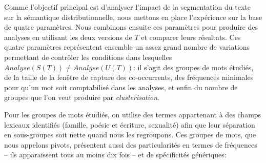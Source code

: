 \begin{table}[ht!]
    \centering
    \caption{Propriétés des différents corpus. Les signes de ponctuation sont ignorés dans le décompte des mots.}
    \label{tab:chap1:noise:corpora_properties}
\end{table}


Comme l'objectif principal est d'analyser l'impact de la segmentation du texte sur la sémantique distributionnelle, nous mettons en place l'expérience sur la base de quatre paramètres. Nous combinons ensuite ces paramètres pour produire des analyses en utilisant les deux versions de $T$ et comparer leurs résultats. Ces quatre paramètres représentent ensemble un assez grand nombre de variations permettant de contrôler les conditions dans lesquelles $Analyse(S(T)) \neq Analyse(U(T))$: il s'agit des groupes de mots étudiés, de la taille de la fenêtre de capture des co-occurrents, des fréquences minimales pour qu'un mot soit comptabilisé dans les analyses, et enfin du nombre de groupes que l'on veut produire par \textit{clusterisation}.

Pour les groupes de mots étudiés, on utilise des termes appartenant à des champs lexicaux identifiés (famille, poésie et écriture, sexualité) afin que leur séparation en sous-groupes soit nette quand nous les regroupons. Ces groupes de mots, que nous appelons pivots, présentent aussi des particularités en termes de fréquences -- ils apparaissent tous au moins dix fois -- et de spécificités génériques:

